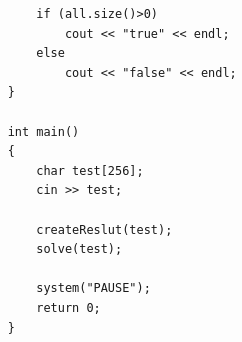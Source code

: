\documentclass[UTF8,a4paper,12pt]{ctexbook}
\begin{document}
\begin{lstlisting}
		if (all.size()>0)
			cout << "true" << endl;
		else
			cout << "false" << endl;
	}
	
	int main()
	{
		char test[256];
		cin >> test;
		
		createReslut(test);
		solve(test);
		
		system("PAUSE");
		return 0;
	}
\end{lstlisting}


 
\end{document}
